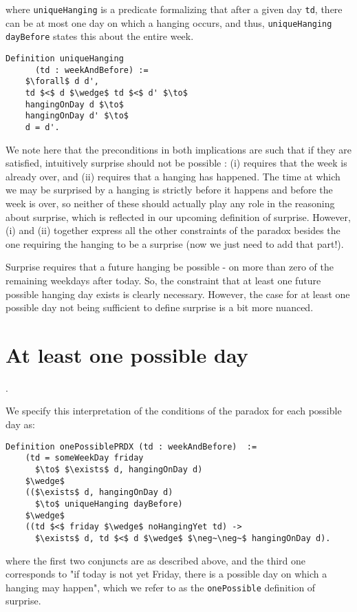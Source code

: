 \documentclass[journal]{journal}
\begin{document}
where {\tt uniqueHanging} is a predicate formalizing that after a given day {\tt td},
there can be at most one day on which a hanging occurs, and thus,
{\tt uniqueHanging dayBefore} states this about the entire week.

\begin{lstlisting}[mathescape=true]
  Definition uniqueHanging
      (td : weekAndBefore) :=
    $\forall$ d d',
    td $<$ d $\wedge$ td $<$ d' $\to$
    hangingOnDay d $\to$
    hangingOnDay d' $\to$
    d = d'.
\end{lstlisting}

We note here that the preconditions in both implications are such that if
they are satisfied, intuitively surprise should not be possible : (i)
requires that the week is already over, and (ii) requires that a hanging
has happened. The time at which we may be surprised by a hanging is strictly
before it happens and before the week is over, so neither of these should
actually play any role in the reasoning about surprise, which is reflected
in our upcoming definition of surprise. However, (i) and (ii) together express all the
other constraints of the paradox besides the one requiring the hanging to
be a surprise (now we just need to add that part!).

Surprise requires that a future hanging be possible - on more than zero
of the remaining weekdays after today.
So, the constraint that at least one future possible hanging day exists is
clearly necessary. However, the case for at least one possible day not
being sufficient to define surprise is a bit more nuanced.

\section{At least one possible day}.
\label{sec:one}

We specify this interpretation
of the conditions of the paradox for each possible day as:

\begin{lstlisting}[mathescape=true]
  Definition onePossiblePRDX (td : weekAndBefore)  :=
    (td = someWeekDay friday
      $\to$ $\exists$ d, hangingOnDay d)
    $\wedge$
    (($\exists$ d, hangingOnDay d)
      $\to$ uniqueHanging dayBefore)
    $\wedge$
    ((td $<$ friday $\wedge$ noHangingYet td) ->
      $\exists$ d, td $<$ d $\wedge$ $\neg~\neg~$ hangingOnDay d).
\end{lstlisting}

where the first two conjuncts are as described above, and
the third one corresponds to "if today is not
  yet Friday, there is a possible day on which a hanging may happen", which
  we refer to as the {\tt onePossible} definition of surprise.
\end{document}
